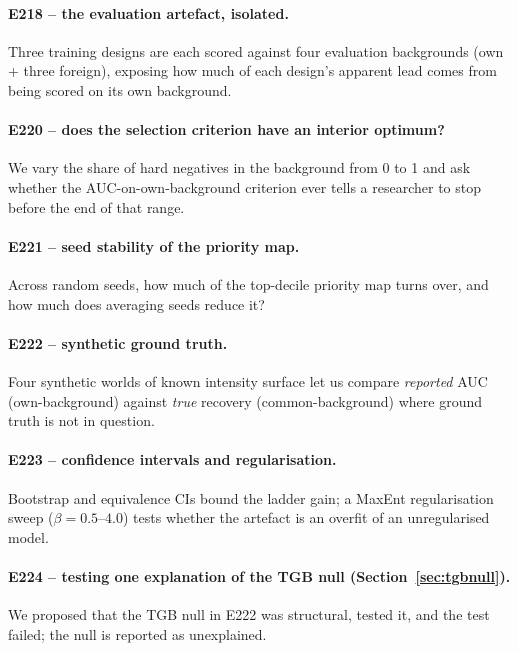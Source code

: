 \documentclass[12pt]{article}
\begin{document}
\paragraph{E218 -- the evaluation artefact, isolated.}
Three training designs are each scored against four evaluation backgrounds (own + three foreign), exposing how much of each design's apparent lead comes from being scored on its own background.

\paragraph{E220 -- does the selection criterion have an interior optimum?}
We vary the share of hard negatives in the background from 0 to 1 and ask whether the AUC-on-own-background criterion ever tells a researcher to stop before the end of that range.

\paragraph{E221 -- seed stability of the priority map.}
Across random seeds, how much of the top-decile priority map turns over, and how much does averaging seeds reduce it?

\paragraph{E222 -- synthetic ground truth.}
Four synthetic worlds of known intensity surface let us compare \emph{reported} AUC (own-background) against \emph{true} recovery (common-background) where ground truth is not in question.

\paragraph{E223 -- confidence intervals and regularisation.}
Bootstrap and equivalence CIs bound the ladder gain; a MaxEnt regularisation sweep ($\beta = 0.5$--$4.0$) tests whether the artefact is an overfit of an unregularised model.

\paragraph{E224 -- testing one explanation of the TGB null (Section~\ref{sec:tgbnull}).}
We proposed that the TGB null in E222 was structural, tested it, and the test failed; the null is reported as unexplained.

\end{document}
